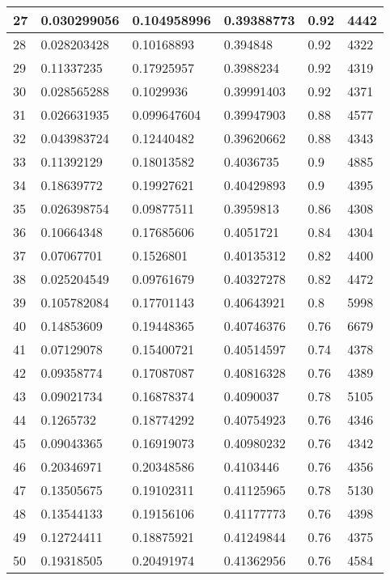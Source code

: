 \begin{longtable}{|l|l|l|l|l|l|}
27 & 0.030299056 & 0.104958996 & 0.39388773 & 0.92 & 4442 \\ \hline 
28 & 0.028203428 & 0.10168893 & 0.394848 & 0.92 & 4322 \\ \hline 
29 & 0.11337235 & 0.17925957 & 0.3988234 & 0.92 & 4319 \\ \hline 
30 & 0.028565288 & 0.1029936 & 0.39991403 & 0.92 & 4371 \\ \hline 
31 & 0.026631935 & 0.099647604 & 0.39947903 & 0.88 & 4577 \\ \hline 
32 & 0.043983724 & 0.12440482 & 0.39620662 & 0.88 & 4343 \\ \hline 
33 & 0.11392129 & 0.18013582 & 0.4036735 & 0.9 & 4885 \\ \hline 
34 & 0.18639772 & 0.19927621 & 0.40429893 & 0.9 & 4395 \\ \hline 
35 & 0.026398754 & 0.09877511 & 0.3959813 & 0.86 & 4308 \\ \hline 
36 & 0.10664348 & 0.17685606 & 0.4051721 & 0.84 & 4304 \\ \hline 
37 & 0.07067701 & 0.1526801 & 0.40135312 & 0.82 & 4400 \\ \hline 
38 & 0.025204549 & 0.09761679 & 0.40327278 & 0.82 & 4472 \\ \hline 
39 & 0.105782084 & 0.17701143 & 0.40643921 & 0.8 & 5998 \\ \hline 
40 & 0.14853609 & 0.19448365 & 0.40746376 & 0.76 & 6679 \\ \hline 
41 & 0.07129078 & 0.15400721 & 0.40514597 & 0.74 & 4378 \\ \hline 
42 & 0.09358774 & 0.17087087 & 0.40816328 & 0.76 & 4389 \\ \hline 
43 & 0.09021734 & 0.16878374 & 0.4090037 & 0.78 & 5105 \\ \hline 
44 & 0.1265732 & 0.18774292 & 0.40754923 & 0.76 & 4346 \\ \hline 
45 & 0.09043365 & 0.16919073 & 0.40980232 & 0.76 & 4342 \\ \hline 
46 & 0.20346971 & 0.20348586 & 0.4103446 & 0.76 & 4356 \\ \hline 
47 & 0.13505675 & 0.19102311 & 0.41125965 & 0.78 & 5130 \\ \hline 
48 & 0.13544133 & 0.19156106 & 0.41177773 & 0.76 & 4398 \\ \hline 
49 & 0.12724411 & 0.18875921 & 0.41249844 & 0.76 & 4375 \\ \hline 
50 & 0.19318505 & 0.20491974 & 0.41362956 & 0.76 & 4584 \\ \hline 
\end{longtable}